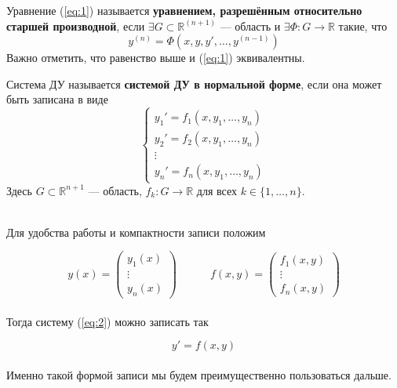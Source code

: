 \documentclass[11pt]{article}
\begin{document}
\begin{definition}
    Уравнение (\ref{eq:1}) называется \textbf{уравнением, разрешённым относительно старшей производной}, если $\exists G \subset \mathbb{R}^{(n + 1)}$ --- область и $\exists \Phi \colon G \to \mathbb{R}$ такие, что
    \[y^{(n)} = \Phi(x, y, y', \ldots, y^{(n - 1)})\] 
    Важно отметить, что равенство выше и (\ref{eq:1}) эквивалентны.
\end{definition}

\begin{definition}
    Система ДУ называется \textbf{системой ДУ в нормальной форме}, если она может быть записана в виде
    \begin{equation} \label{eq:2}
        \begin{cases}
            y_1' = f_1(x, y_1, \ldots, y_n) \\
            y_2' = f_2(x, y_1, \ldots, y_n) \\
            \vdots \\
            y_n' = f_n(x, y_1, \ldots, y_n)
        \end{cases}
    \end{equation}
    Здесь $G \subset \mathbb{R}^{n + 1}$ --- область, $f_k \colon G \to \mathbb{R}$ для всех $k \in \{1, \ldots, n\}$.
\end{definition} \leavevmode
\\
Для удобства работы и компактности записи положим

\begin{equation*}
    y(x) = 
    \begin{pmatrix}
        y_1(x) \\
        \vdots \\
        y_n(x)
    \end{pmatrix}
    \quad \quad \quad
    f(x, y) = 
    \begin{pmatrix}
        f_1(x, y) \\
        \vdots \\
        f_n(x, y)
    \end{pmatrix}
\end{equation*} \leavevmode
\\
Тогда систему (\ref{eq:2}) можно записать так

\begin{equation} \label{eq:3}
    y' = f(x, y)
\end{equation} \leavevmode
\\
Именно такой формой записи мы будем преимущественно пользоваться дальше.
\end{document}

